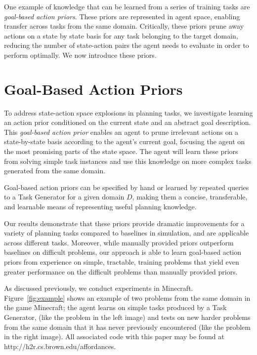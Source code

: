 \documentclass[11pt]{article}
\begin{document}
One example of knowledge that can be learned from a series of training tasks are {\it goal-based action priors}. These priors are represented in agent space, enabling transfer across tasks from the same domain. Critically, these priors prune away actions on a state by state basis for any task belonging to the target domain, reducing the number of state-action pairs the agent needs to evaluate in order to perform optimally. We now introduce these priors.

\section{Goal-Based Action Priors}
\label{sec:gbaps}

To address state-action space explosions in planning tasks,
we investigate learning an action prior conditioned on the current state and an abstract goal description. This {\it goal-based action prior}
enables an agent to prune irrelevant actions on a
state-by-state basis according to the agent's current goal, focusing the agent on
the most promising parts of the state space. The agent will learn these priors from solving simple task instances and use this knowledge on more complex tasks generated from the same domain.
 
Goal-based action priors can be specified by hand or learned by repeated queries to a Task Generator for a given domain $D$, making them a concise, transferable, and learnable means of
representing useful planning knowledge. 

Our results demonstrate
that these priors provide dramatic improvements for a variety of
planning tasks compared to baselines in simulation, and are applicable
across different tasks.  Moreover, while manually provided
priors outperform baselines on difficult problems, our approach
is able to learn goal-based action priors from experience on simple, tractable, 
training problems that yield even greater performance on the difficult problems
than manually provided priors.

As discussed previously, we conduct experiments in Minecraft. Figure~\ref{fig:example}
shows an example of two problems from the same domain in the game
Minecraft; the agent learns on simple tasks produced by a Task Generator,
(like the problem in the left image) and tests
on new harder problems from the same domain that it has never previously
encountered (like the problem in the right image). All associated code with this paper may be found at
http://h2r.cs.brown.edu/affordances.
\end{document}
